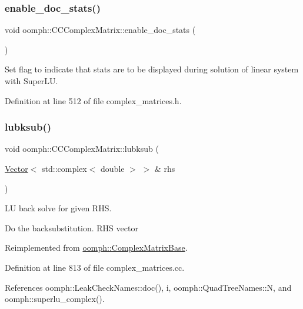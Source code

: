 \subsubsection{\texorpdfstring{enable\+\_\+doc\+\_\+stats()}{enable\_doc\_stats()}}
{\footnotesize\ttfamily void oomph\+::\+C\+C\+Complex\+Matrix\+::enable\+\_\+doc\+\_\+stats (\begin{DoxyParamCaption}{ }\end{DoxyParamCaption})\hspace{0.3cm}{\ttfamily [inline]}}



Set flag to indicate that stats are to be displayed during solution of linear system with Super\+LU. 



Definition at line 512 of file complex\+\_\+matrices.\+h.

\mbox{\label{classoomph_1_1CCComplexMatrix_ade5d51dc8e2a44b6c011184366ce052c}} 
\subsubsection{\texorpdfstring{lubksub()}{lubksub()}}
{\footnotesize\ttfamily void oomph\+::\+C\+C\+Complex\+Matrix\+::lubksub (\begin{DoxyParamCaption}\item[{\hyperlink{classoomph_1_1Vector}{Vector}$<$ std\+::complex$<$ double $>$ $>$ \&}]{rhs }\end{DoxyParamCaption})\hspace{0.3cm}{\ttfamily [virtual]}}



LU back solve for given R\+HS. 

Do the backsubstitution. R\+HS vector 

Reimplemented from \hyperlink{classoomph_1_1ComplexMatrixBase_aa0e444d60d4ec9e35a6903ab88baaf62}{oomph\+::\+Complex\+Matrix\+Base}.



Definition at line 813 of file complex\+\_\+matrices.\+cc.



References oomph\+::\+Leak\+Check\+Names\+::doc(), i, oomph\+::\+Quad\+Tree\+Names\+::N, and oomph\+::superlu\+\_\+complex().


